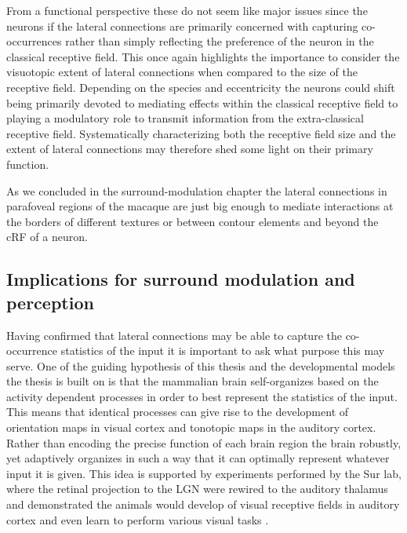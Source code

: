 From a functional perspective these do not seem like major issues
since the neurons if the lateral connections are primarily concerned
with capturing co-occurrences rather than simply reflecting the
preference of the neuron in the classical receptive field. This once
again highlights the importance to consider the visuotopic extent of
lateral connections when compared to the size of the receptive
field. Depending on the species and eccentricity the neurons could
shift being primarily devoted to mediating effects within the
classical receptive field to playing a modulatory role to transmit
information from the extra-classical receptive field. Systematically
characterizing both the receptive field size and the extent of lateral
connections may therefore shed some light on their primary function.

As we concluded in the surround-modulation chapter the lateral
connections in parafoveal regions of the macaque are just big enough
to mediate interactions at the borders of different textures or
between contour elements and beyond the cRF of a neuron.

\subsection{Implications for surround modulation and perception}

Having confirmed that lateral connections may be able to capture the
co-occurrence statistics of the input it is important to ask what
purpose this may serve. One of the guiding hypothesis of this thesis
and the developmental models the thesis is built on is that the
mammalian brain self-organizes based on the activity dependent
processes in order to best represent the statistics of the input. This
means that identical processes can give rise to the development of
orientation maps in visual cortex and tonotopic maps in the auditory
cortex. Rather than encoding the precise function of each brain region
the brain robustly, yet adaptively organizes in such a way that it can
optimally represent whatever input it is given. This idea is supported
by experiments performed by the Sur lab, where the retinal projection
to the LGN were rewired to the auditory thalamus and demonstrated the
animals would develop of visual receptive fields in auditory cortex
and even learn to perform various visual tasks
\citep{vonMelchner2000}.

